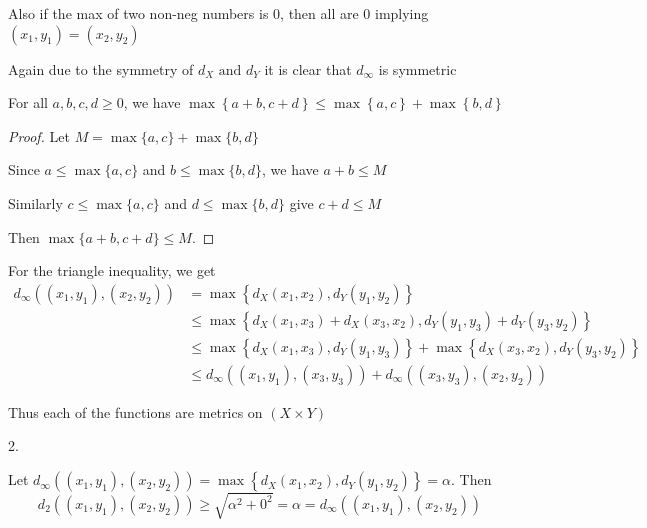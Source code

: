 \documentclass{article}
\begin{document}
\begin{problem}
\begin{solution}
	Also if the max of two non-neg numbers is 0, then all are 0 implying \( (x_{1},y_{1})  = (x_{2},y_{2})\)

	Again due to the symmetry of \( d_X \text{ and } d_Y \) it is clear that \( d_{\infty} \) is symmetric

	\begin{lemma}
		For all \( a,b,c,d \ge 0 \), we have \( \max\left\{ a+b, c + d \right\} \le \max\left\{ a,c \right\} + \max\left\{ b,d \right\}  \)
	\end{lemma}
	\begin{proof}
		Let \( M = \max\{a,c\} + \max\{b,d\} \)

		Since \( a \le \max\{a,c\} \) and \( b \le \max\{b,d\} \), we have \( a + b \le M \)

		Similarly \( c \le \max\{a,c\} \) and \( d \le \max\{b,d\} \) give \( c + d \le M \)

		Then \( \max\{a+b, c+d\} \le M \).
	\end{proof}

	For the triangle inequality, we get
	\begin{align*}
		d_{\infty}((x_{1},y_{1}),(x_{2},y_{2})) & = \max\left\{ d_X(x_{1},x_{2}), d_Y(y_{1},y_{2}) \right\}                                                             \\
		                                        & \le \max\left\{ d_X(x_{1},x_{3}) + d_X(x_{3},x_{2}), d_Y(y_{1},y_{3}) + d_Y(y_{3},y_{2}) \right\}                     \\
		                                        & \le \max\left\{ d_X(x_{1},x_{3}), d_Y(y_{1},y_{3}) \right\} + \max\left\{ d_X(x_{3},x_{2}), d_Y(y_{3},y_{2}) \right\} \\
		                                        & \le d_{\infty}((x_{1},y_{1}),(x_{3},y_{3})) + d_{\infty}((x_{3},y_{3}),(x_{2},y_{2}))
	\end{align*}

	Thus each of the functions are metrics on \( (X \times Y) \)

\end{solution}


\begin{solution}2.

	Let \( d_{\infty}((x_{1},y_{1}),(x_{2},y_{2})) = \max\left\{ d_X(x_1,x_{2}), d_Y(y_{1},y_{2}) \right\} = \alpha\). Then
	\begin{equation}
		d_2((x_{1},y_{1}),(x_{2},y_{2})) \ge \sqrt{\alpha ^2 + 0^2} = \alpha = d_{\infty}((x_{1},y_{1}),(x_{2},y_{2}))
	\end{equation}


\end{solution}
\end{problem}
\end{document}
